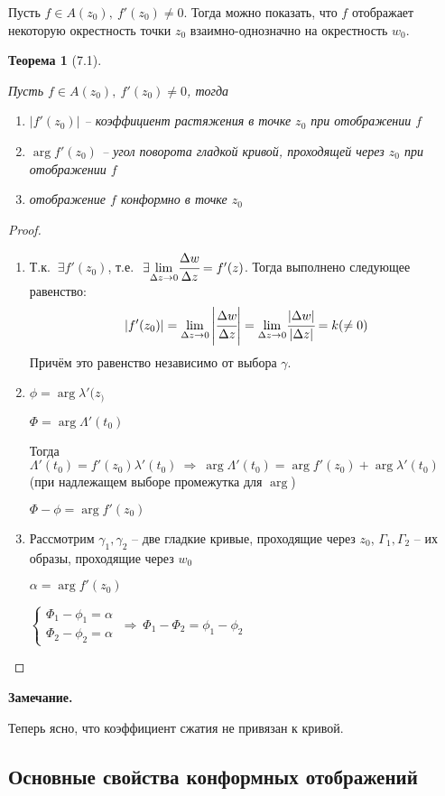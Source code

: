 \documentclass[final]{report}
\newcommand{\forcenewline}{$\phantom{\mbox{newline}}$\newline}
\newcommand{\then}{\ \Rightarrow\ }
\newcommand{\mlim}[1]{\underset{#1}{\lim}}
\renewcommand{\a}{\alpha}
\newcommand{\g}{\gamma}
\renewcommand{\f}{\phi}
\renewcommand{\l}{\lambda}
\newcommand{\D}{\Delta}
\newcommand{\E}{\ \exists}
\newcommand{\sys}[1]{\left\{\begin{matrix}#1\end{matrix}\right.}
\newtheorem*{theor}{Теорема}
\theoremstyle{remark}
\begin{document}
Пусть $f\in A(z_0),\ f'(z_0)\neq0$. Тогда можно показать, что $f$ отображает некоторую окрестность точки $z_0$ взаимно-однозначно на окрестность $w_0$.

\begin{theor}[7.1]
\forcenewline

Пусть $f\in A(z_0),\ f'(z_0)\neq0$, тогда
\begin{enumerate}
\item[а)] $|f'(z_0)|$ -- коэффициент растяжения в точке $z_0$ при отображении $f$
\item[б)] $\arg f'(z_0)$ -- угол поворота гладкой кривой, проходящей через $z_0$ при отображении $f$
\item[в)] отображение $f$ конформно в точке $z_0$
\end{enumerate}
\end{theor}

\begin{proof}
\forcenewline
\begin{enumerate}
\item[а)] Т.к. $\E f'(z_0)$, т.е. $\E \mlim{\D z\to0}\cfrac{\D w}{\D z}=f'(z)$. Тогда выполнено следующее равенство:
$$|f'(z_0)|=\mlim{\D z\to0}\left|\cfrac{\D w}{\D z}\right|=\mlim{\D z\to0}\cfrac{|\D w|}{|\D z|}=k(\neq0)$$
Причём это равенство независимо от выбора $\g$.
\item[б)] $\f=\arg \l'(z_)$

$\Phi=\arg\Lambda'(t_0)$

Тогда $\Lambda'(t_0)=f'(z_0)\l'(t_0)\then\arg\Lambda'(t_0)=\arg f'(z_0)+\arg\l'(t_0)$ (при надлежащем выборе промежутка для $\arg$)

$\Phi-\f=\arg f'(z_0)$
\item[в)] Рассмотрим $\g_1,\g_2$ -- две гладкие кривые, проходящие через $z_0$, $\Gamma_1,\Gamma_2$ -- их образы, проходящие через $w_0$

$\a=\arg f'(z_0)$

$\sys{\Phi_1-\f_1=\a \\ \Phi_2-\f_2=\a } \then \Phi_1-\Phi_2=\f_1-\f_2$
\end{enumerate}
\end{proof}

{\bfseries Замечание.}

Теперь ясно, что коэффициент сжатия не привязан к кривой.

\subsection{Основные свойства конформных отображений}
\end{document}
